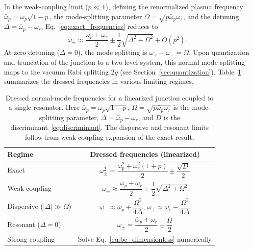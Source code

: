\documentclass[reprint, floatfix, superscriptaddress, amsmath, amssymb, longbibliography]{revtex4-2}
\begin{document}
In the weak-coupling limit ($p \ll 1$), defining the renormalized plasma frequency $\bar{\omega}_p = \omega_p\sqrt{1-p}$, the mode-splitting parameter $\Omega = \sqrt{p\bar{\omega}_p\omega_r}$, and the detuning $\Delta = \bar{\omega}_p - \omega_r$, Eq.~\eqref{eq:exact_frequencies} reduces to
\begin{equation}
\omega_\pm \approx \frac{\bar{\omega}_p + \omega_r}{2} \pm \frac{1}{2}\sqrt{\Delta^2 + \Omega^2} + O(p^2).
\label{eq:weak_coupling_frequencies}
\end{equation}
At zero detuning ($\Delta = 0$), the mode splitting is $\omega_+ - \omega_- = \Omega$. Upon quantization and truncation of the junction to a two-level system, this normal-mode splitting maps to the vacuum Rabi splitting $2g$ (see Section~\ref{sec:quantization}). Table~\ref{tab:single_mode_formulas} summarizes the dressed frequencies in various limiting regimes.

\begin{table}[t]
\caption{Dressed normal-mode frequencies for a linearized junction coupled to a single resonator. Here $\bar{\omega}_p = \omega_p\sqrt{1-p}$, $\Omega = \sqrt{p\bar{\omega}_p\omega_r}$ is the mode-splitting parameter, $\Delta = \bar{\omega}_p - \omega_r$, and $D$ is the discriminant~\eqref{eq:discriminant}. The dispersive and resonant limits follow from weak-coupling expansion of the exact result.}
\label{tab:single_mode_formulas}
\begin{ruledtabular}
\begin{tabular}{lc}
\textrm{Regime} & \textrm{Dressed frequencies (linearized)} \\
\midrule
Exact & $\omega_\pm^2 = \dfrac{\omega_p^2 + \omega_r^2(1+p)}{2} \pm \dfrac{\sqrt{D}}{2}$ \\[10pt]
Weak coupling & $\omega_\pm \approx \dfrac{\bar{\omega}_p + \omega_r}{2} \pm \dfrac{1}{2}\sqrt{\Delta^2 + \Omega^2}$ \\[10pt]
Dispersive ($|\Delta| \gg \Omega$) & $\omega_- \approx \bar{\omega}_p + \dfrac{\Omega^2}{4\Delta}$, \quad $\omega_+ \approx \omega_r - \dfrac{\Omega^2}{4\Delta}$ \\[8pt]
Resonant ($\Delta = 0$) & $\omega_\pm = \dfrac{\bar{\omega}_p + \omega_r}{2} \pm \dfrac{\Omega}{2}$ \\[6pt]
Strong coupling & Solve Eq.~\eqref{eq:bc_dimensionless} numerically \\
\end{tabular}
\end{ruledtabular}
\end{table}
\end{document}
